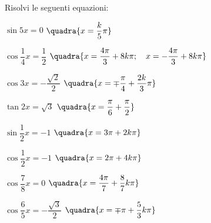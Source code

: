\begin{esercizio}\label{ese:03.1}
Risolvi le seguenti equazioni:
 \begin{enumeratea}
  \item \(\sin 5x = 0\)
   \hfill \(\quadra{x = \dfrac{k}{5} \pi}\)
  \item \(\cos \dfrac{1}{4} x = \dfrac{1}{2}\)
   \hfill \(\quadra{x = \dfrac{4 \pi}{3} + 8k \pi; \quad
                   x = -\dfrac{4\pi}{3} + 8k \pi}\)
  \item \(\cos 3x = -\dfrac{\sqrt{2}}{2}\)
   \hfill \(\quadra{x = \mp \dfrac{\pi}{4} + \dfrac{2k}{3} \pi}\)
  \item \(\tan 2x = \sqrt{3}\)
   \hfill \(\quadra{x = \dfrac{\pi}{6} + \dfrac{\pi}{2}}\)
  \item \(\sin \dfrac{1}{2} x = -1\)
   \hfill \(\quadra{x = 3\pi + 2k \pi}\)
  \item \(\cos \dfrac{1}{2} x = -1\)
   \hfill \(\quadra{x = 2 \pi + 4k \pi}\)
  \item \(\cos \dfrac{7}{8}x = 0\)
   \hfill \(\quadra{x = \dfrac{4\pi}{7} + \dfrac{8}{7}k \pi}\)
  \item \(\cos \dfrac{6}{5}x = -\dfrac{\sqrt{3}}{2}\)
   \hfill \(\quadra{x = \mp \pi + \dfrac{5}{3} k \pi}\)
 \end{enumeratea}
\end{esercizio}

